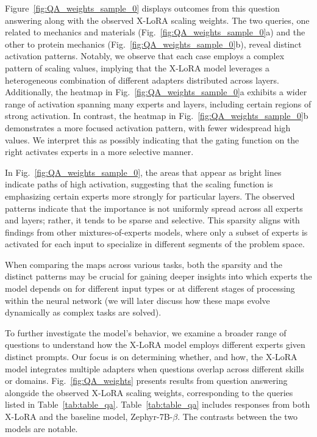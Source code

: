 Figure~\ref{fig:QA_weights_sample_0} displays outcomes from this question answering along with the observed X-LoRA scaling weights. The two queries, one related to mechanics and materials (Fig.~\ref{fig:QA_weights_sample_0}a) and the other to protein mechanics (Fig.~\ref{fig:QA_weights_sample_0}b), reveal distinct activation patterns. Notably, we observe that each case employs a complex pattern of scaling values, implying that the X-LoRA model leverages a heterogeneous combination of different adapters distributed across layers. Additionally, the heatmap in Fig.~\ref{fig:QA_weights_sample_0}a exhibits a wider range of activation spanning many experts and layers, including certain regions of strong activation. In contrast, the heatmap in Fig.~\ref{fig:QA_weights_sample_0}b demonstrates a more focused activation pattern, with fewer widespread high values. We interpret this as possibly indicating that the gating function on the right activates experts in a more selective manner.

In Fig.~\ref{fig:QA_weights_sample_0}, the areas that appear as bright lines indicate paths of high activation, suggesting that the scaling function is emphasizing certain experts more strongly for particular layers. The observed patterns indicate that the importance is not uniformly spread across all experts and layers; rather, it tends to be sparse and selective. This sparsity aligns with findings from other mixtures-of-experts models, where only a subset of experts is activated for each input to specialize in different segments of the problem space.

When comparing the maps across various tasks, both the sparsity and the distinct patterns may be crucial for gaining deeper insights into which experts the model depends on for different input types or at different stages of processing within the neural network (we will later discuss how these maps evolve dynamically as complex tasks are solved).

To further investigate the model's behavior, we examine a broader range of questions to understand how the X-LoRA model employs different experts given distinct prompts. Our focus is on determining whether, and how, the X-LoRA model integrates multiple adapters when questions overlap across different skills or domains. Fig.~\ref{fig:QA_weights} presents results from question answering alongside the observed X-LoRA scaling weights, corresponding to the queries listed in Table~\ref{tab:table_qa}. Table~\ref{tab:table_qa} includes responses from both X-LoRA and the baseline model, Zephyr-7B-$\beta$. The contrasts between the two models are notable.

